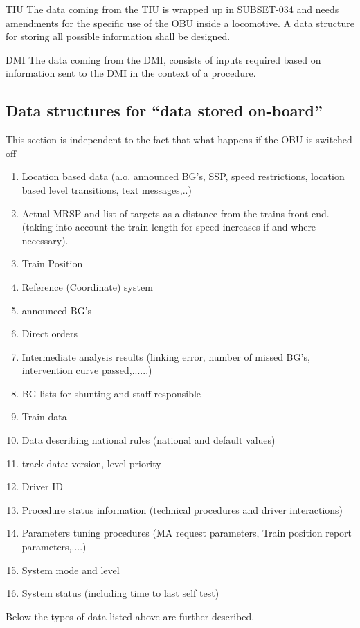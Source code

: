 TIU
The data coming from the TIU is wrapped up in SUBSET-034 and needs amendments for the specific use of the OBU inside a locomotive. A data structure for storing all possible information shall be designed.

DMI
The data coming from the DMI, consists of inputs required based on information sent to the DMI in the context of a procedure.



\subsection{Data structures for “data stored on-board”}
This section is independent to the fact that what happens if the OBU is switched off
\begin{enumerate}
\item Location based data (a.o. announced BG's, SSP, speed restrictions, location based level transitions, text messages,..)
\item Actual MRSP and list of targets as a distance from the trains front end. (taking into account the train length for speed increases if and where necessary).
\item Train Position
\item Reference (Coordinate) system 
\item announced BG's
\item Direct orders 
\item Intermediate analysis results (linking error, number of missed BG's, intervention curve passed,......)
\item BG lists for shunting and staff responsible
\item Train data
\item Data describing national rules (national and default values)
\item track data:  version, level priority
\item Driver ID
\item Procedure status information (technical procedures and driver interactions)
\item Parameters tuning procedures (MA request parameters, Train position report parameters,....)
\item System mode and level
\item System status (including time to last self test)
\end{enumerate}
Below the types of data listed above are further described.


